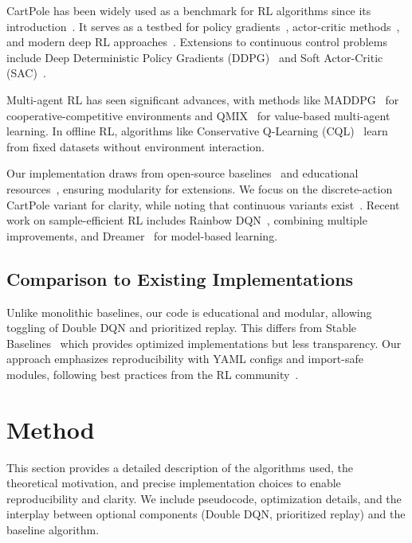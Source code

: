 \documentclass{IEEEtran}
\begin{document}
CartPole has been widely used as a benchmark for RL algorithms since its introduction~\cite{barto1983neuronlike}. It serves as a testbed for policy gradients~\cite{williams1992simple}, actor-critic methods~\cite{konda2000actor}, and modern deep RL approaches~\cite{schulman2017proximal}. Extensions to continuous control problems include Deep Deterministic Policy Gradients (DDPG)~\cite{lillicrap2015continuous} and Soft Actor-Critic (SAC)~\cite{haarnoja2018soft}.

Multi-agent RL has seen significant advances, with methods like MADDPG~\cite{lowe2017multi} for cooperative-competitive environments and QMIX~\cite{rashid2018qmix} for value-based multi-agent learning. In offline RL, algorithms like Conservative Q-Learning (CQL)~\cite{kumar2020conservative} learn from fixed datasets without environment interaction.

Our implementation draws from open-source baselines~\cite{dhariwal2017openai} and educational resources~\cite{sutton2018reinforcement}, ensuring modularity for extensions. We focus on the discrete-action CartPole variant for clarity, while noting that continuous variants exist~\cite{brockman2016openai}. Recent work on sample-efficient RL includes Rainbow DQN~\cite{hessel2018rainbow}, combining multiple improvements, and Dreamer~\cite{hafner2019dream} for model-based learning.

\subsection{Comparison to Existing Implementations}

Unlike monolithic baselines, our code is educational and modular, allowing toggling of Double DQN and prioritized replay. This differs from Stable Baselines~\cite{stable-baselines3} which provides optimized implementations but less transparency. Our approach emphasizes reproducibility with YAML configs and import-safe modules, following best practices from the RL community~\cite{engstrom2019implementation}.

\section{Method}

This section provides a detailed description of the algorithms used, the theoretical motivation, and precise implementation choices to enable reproducibility and clarity. We include pseudocode, optimization details, and the interplay between optional components (Double DQN, prioritized replay) and the baseline algorithm.
\end{document}

